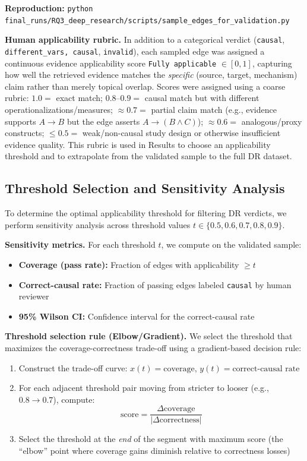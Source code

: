 \textbf{Reproduction:} \texttt{python final\_runs/RQ3\_deep\_research/scripts/sample\_edges\_for\_validation.py}

\vspace{0.25em}
\textbf{Human applicability rubric.} In addition to a categorical verdict (\texttt{causal}, \texttt{different\_vars, causal}, \texttt{invalid}), each sampled edge was assigned a continuous evidence applicability score \texttt{Fully applicable} \(\in[0,1]\), capturing how well the retrieved evidence matches the \textit{specific} (source, target, mechanism) claim rather than merely topical overlap. Scores were assigned using a coarse rubric: \(1.0=\) exact match; \(0.8\text{--}0.9=\) causal match but with different operationalizations/measures; \(\approx 0.7=\) partial claim match (e.g., evidence supports \(A\rightarrow B\) but the edge asserts \(A\rightarrow(B \wedge C)\)); \(\approx 0.6=\) analogous/proxy constructs; \(\le 0.5=\) weak/non-causal study design or otherwise insufficient evidence quality. This rubric is used in Results to choose an applicability threshold and to extrapolate from the validated sample to the full DR dataset.

\subsection{Threshold Selection and Sensitivity Analysis}
\label{sec:rq3_threshold_selection}

To determine the optimal applicability threshold for filtering DR verdicts, we perform sensitivity analysis across threshold values $t \in \{0.5, 0.6, 0.7, 0.8, 0.9\}$.

\textbf{Sensitivity metrics.} For each threshold $t$, we compute on the validated sample:
\begin{itemize}[noitemsep]
    \item \textbf{Coverage (pass rate):} Fraction of edges with applicability $\geq t$
    \item \textbf{Correct-causal rate:} Fraction of passing edges labeled \texttt{causal} by human reviewer
    \item \textbf{95\% Wilson CI:} Confidence interval for the correct-causal rate
\end{itemize}

\textbf{Threshold selection rule (Elbow/Gradient).} We select the threshold that maximizes the coverage-correctness trade-off using a gradient-based decision rule:
\begin{enumerate}[noitemsep]
    \item Construct the trade-off curve: $x(t) = \text{coverage}$, $y(t) = \text{correct-causal rate}$
    \item For each adjacent threshold pair moving from stricter to looser (e.g., $0.8 \rightarrow 0.7$), compute:
    \[
    \text{score} = \frac{\Delta \text{coverage}}{|\Delta \text{correctness}|}
    \]
    \item Select the threshold at the \textit{end} of the segment with maximum score (the ``elbow'' point where coverage gains diminish relative to correctness losses)
\end{enumerate}

